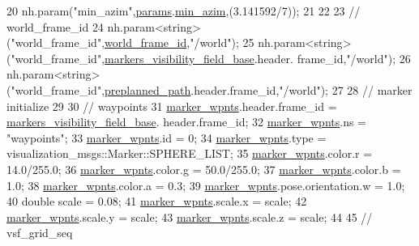 \begin{DoxyCode}
20     nh.param(\textcolor{stringliteral}{"min\_azim"},\hyperlink{class_preplanner_a679cc4b70f041aff73769e7ec92dc5d0}{params}.\hyperlink{structchaser_1_1_preplanner_params_aa6846dd2e2d69d5f0d5a9b30710db6e1}{min\_azim},(3.141592/7));
21 
22 
23     \textcolor{comment}{// world\_frame\_id }
24     nh.param<\textcolor{keywordtype}{string}>(\textcolor{stringliteral}{"world\_frame\_id"},\hyperlink{class_preplanner_a08cb79c25bd4ded139a572672e4492cd}{world\_frame\_id},\textcolor{stringliteral}{"/world"});
25     nh.param<\textcolor{keywordtype}{string}>(\textcolor{stringliteral}{"world\_frame\_id"},\hyperlink{class_preplanner_a9c4d6a5e43241831b0ad11bdaf99ab16}{markers\_visibility\_field\_base}.header.
      frame\_id,\textcolor{stringliteral}{"/world"});
26     nh.param<\textcolor{keywordtype}{string}>(\textcolor{stringliteral}{"world\_frame\_id"},\hyperlink{class_preplanner_ace035c98e9dc23739402d346976d567b}{preplanned\_path}.header.frame\_id,\textcolor{stringliteral}{"/world"});
27 
28     \textcolor{comment}{// marker initialize }
29     
30     \textcolor{comment}{// waypoints }
31     \hyperlink{class_preplanner_adcc96f6ec12d7cb9980aa0c889b4ccd1}{marker\_wpnts}.header.frame\_id = \hyperlink{class_preplanner_a9c4d6a5e43241831b0ad11bdaf99ab16}{markers\_visibility\_field\_base}.
      header.frame\_id;
32     \hyperlink{class_preplanner_adcc96f6ec12d7cb9980aa0c889b4ccd1}{marker\_wpnts}.ns = \textcolor{stringliteral}{"waypoints"};
33     \hyperlink{class_preplanner_adcc96f6ec12d7cb9980aa0c889b4ccd1}{marker\_wpnts}.id = 0;
34     \hyperlink{class_preplanner_adcc96f6ec12d7cb9980aa0c889b4ccd1}{marker\_wpnts}.type = visualization\_msgs::Marker::SPHERE\_LIST;
35     \hyperlink{class_preplanner_adcc96f6ec12d7cb9980aa0c889b4ccd1}{marker\_wpnts}.color.r = 14.0/255.0;
36     \hyperlink{class_preplanner_adcc96f6ec12d7cb9980aa0c889b4ccd1}{marker\_wpnts}.color.g = 50.0/255.0;
37     \hyperlink{class_preplanner_adcc96f6ec12d7cb9980aa0c889b4ccd1}{marker\_wpnts}.color.b = 1.0;
38     \hyperlink{class_preplanner_adcc96f6ec12d7cb9980aa0c889b4ccd1}{marker\_wpnts}.color.a = 0.3;
39     \hyperlink{class_preplanner_adcc96f6ec12d7cb9980aa0c889b4ccd1}{marker\_wpnts}.pose.orientation.w = 1.0;
40     \textcolor{keywordtype}{double} scale = 0.08; 
41     \hyperlink{class_preplanner_adcc96f6ec12d7cb9980aa0c889b4ccd1}{marker\_wpnts}.scale.x = scale;
42     \hyperlink{class_preplanner_adcc96f6ec12d7cb9980aa0c889b4ccd1}{marker\_wpnts}.scale.y = scale;
43     \hyperlink{class_preplanner_adcc96f6ec12d7cb9980aa0c889b4ccd1}{marker\_wpnts}.scale.z = scale;    
44 
45     \textcolor{comment}{// vsf\_grid\_seq }

\end{DoxyCode}
